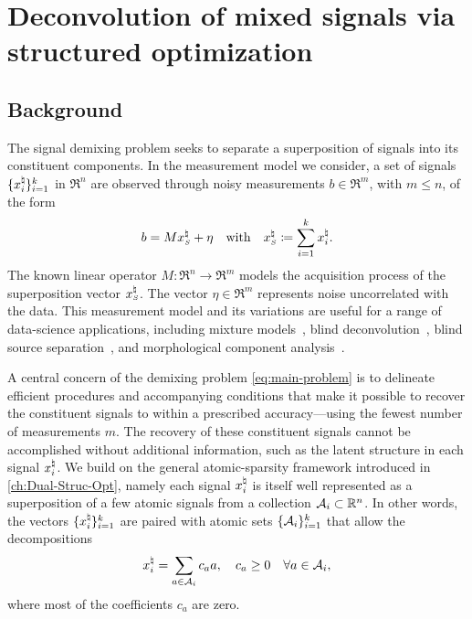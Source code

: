 \chapter{Deconvolution of mixed signals via structured optimization}
\label{ch:App-Sig-Demix}

\section{Background}

The signal demixing problem seeks to separate a superposition of signals into its constituent components. In the measurement model we consider, a set of signals $\{x_i^{\natural}\}_{i=1}^k$ in $\Re^n$ are observed through noisy
measurements $b\in\Re^m$, with $m\le n$, of the form
\begin{equation}\label{eq:main-problem}
  b = Mx_{\scriptscriptstyle S}^\natural + \eta \hbox{\quad with\quad} x_{\scriptscriptstyle S}^\natural\coloneqq \sum\limits_{i = 1}^k x_i^{\natural}.
\end{equation}
The known linear operator $M:\Re^n \rightarrow \Re^m$ models the acquisition process of the superposition vector $x_{\scriptscriptstyle S}^\natural$. The vector $\eta\in \Re^m$ represents noise uncorrelated with the data. This measurement model and its variations are useful for a range of data-science applications, including mixture models~\cite{araki2009blind,quiros2012dependent}, blind deconvolution~\cite{ahmed2013blind}, blind source separation~\cite{chan2008convex}, and morphological component analysis~\cite{bobin2007morphological}.

A central concern of the demixing problem \eqref{eq:main-problem} is to delineate efficient procedures and accompanying conditions that make it possible to recover the constituent signals to within a prescribed accuracy---using the fewest number of measurements $m$. The recovery of these constituent signals cannot be accomplished without additional information, such as the latent structure in each signal $x_i^{\natural}$. We build on the general atomic-sparsity framework introduced in \autoref{ch:Dual-Struc-Opt}, namely each signal $x_i^{\natural}$ is itself well represented as a superposition of a few atomic signals from a collection  $\mathcal{A}_i\subset\mathbb{R}^n$. In other words, the vectors $\{x_i^{\natural}\}_{i=1}^k$ are paired with atomic sets $\{\mathcal{A}_i\}_{i=1}^k$ that allow the decompositions
\begin{equation} \label{eq:decomposition}
  x_i^{\natural} = \sum_{a\in \mathcal{A}_i}c_a a, \quad c_a\geq 0\quad \forall a \in \mathcal{A}_i,
\end{equation}
where most of the coefficients $c_a$ are zero.

